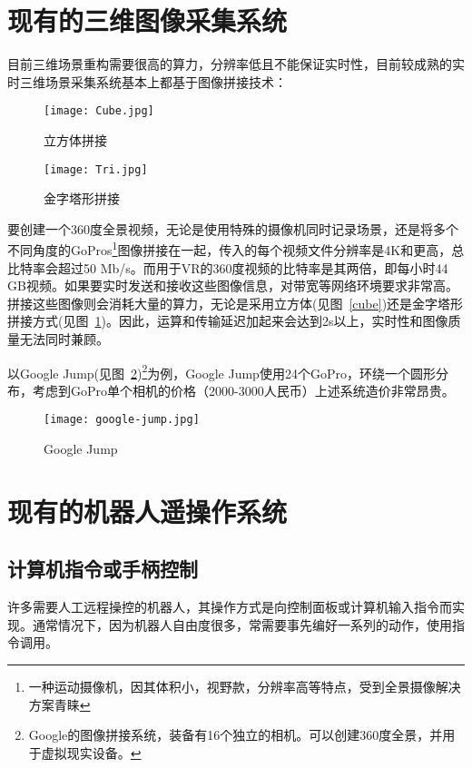 \section{现有的三维图像采集系统}

目前三维场景重构需要很高的算力，分辨率低且不能保证实时性，目前较成熟的实时三维场景采集系统基本上都基于图像拼接技术：

\begin{figure}
\begin{minipage}{0.48\textwidth}
  \centering
  \texttt{[image: Cube.jpg]}
  \caption{立方体拼接}
  \label{cube}
\end{minipage}\hfill
\begin{minipage}{0.48\textwidth}
  \centering
  \texttt{[image: Tri.jpg]}
  \caption{金字塔形拼接}
  \label{tri}
\end{minipage}
\end{figure}

要创建一个360度全景视频，无论是使用特殊的摄像机同时记录场景，还是将多个不同角度的GoPros\footnote{一种运动摄像机，因其体积小，视野款，分辨率高等特点，受到全景摄像解决方案青睐}图像拼接在一起，传入的每个视频文件分辨率是4K和更高，总比特率会超过50 Mb/s。而用于VR的360度视频的比特率是其两倍，即每小时44 GB视频。如果要实时发送和接收这些图像信息，对带宽等网络环境要求非常高。拼接这些图像则会消耗大量的算力，无论是采用立方体(见图~\ref{cube})还是金字塔形拼接方式(见图~\ref{tri})。因此，运算和传输延迟加起来会达到2s以上，实时性和图像质量无法同时兼顾。

以Google Jump(见图~\ref{jump})\footnote{Google的图像拼接系统，装备有16个独立的相机。可以创建360度全景，并用于虚拟现实设备。}为例，Google Jump使用24个GoPro，环绕一个圆形分布，考虑到GoPro单个相机的价格（2000-3000人民币）上述系统造价非常昂贵。

\begin{figure}[htbp]
\small
\centering
\texttt{[image: google-jump.jpg]}
\caption{Google Jump} 
\label{jump}
\end{figure}

\section{现有的机器人遥操作系统}

\subsection{计算机指令或手柄控制}
许多需要人工远程操控的机器人，其操作方式是向控制面板或计算机输入指令而实现。通常情况下，因为机器人自由度很多，常需要事先编好一系列的动作，使用指令调用。

